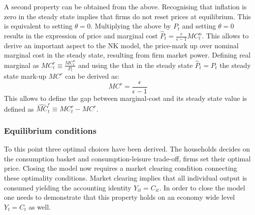 \documentclass[12pt,a4paper,english]{article} %
\begin{document}
	A second property can be obtained from the above. Recognising that inflation is zero in the steady state implies that firms do not reset prices at equilibrium. This is equivalent to setting $\theta=0$. Multiplying the above by $P_t$ and setting $\theta=0$ results in the expression of price and marginal cost $\hat{P}_t = \frac{\epsilon}{\epsilon-1} MC_t^n$. This allows to derive an important aspect to the NK model, the price-mark up over nominal marginal cost in the steady state, resulting from firm market power. Defining real marginal as $MC_t^r \equiv \frac{MC_t^n}{P_t}$ and using the that in the steady state $\hat{P}_t = P_t$ the steady state mark-up $MC^r$ can be derived as:	
	\begin{equation} \label{eq:nk_mark-up}
		MC^r = \frac{\epsilon}{\epsilon-1}
	\end{equation} 
	This allows to define the gap between marginal-cost and its steady state value is defined as $\hat{MC}_t^r \equiv MC_t^r - MC^r$.
	
	\subsubsection{Equilibrium conditions}  \label{nk_eqili}
	To this point three optimal choices have been derived. The households decides on the consumption basket and consumption-leisure trade-off, firms set their optimal price. Closing the model now requires a market clearing condition connecting these optimality conditions. Market clearing implies that all individual output is consumed yielding the accounting identity $Y_{it} = C_{it}$. In order to close the model one needs to demonstrate that this property holds on an economy wide level $Y_t = C_t$ as well.
	
\end{document}
